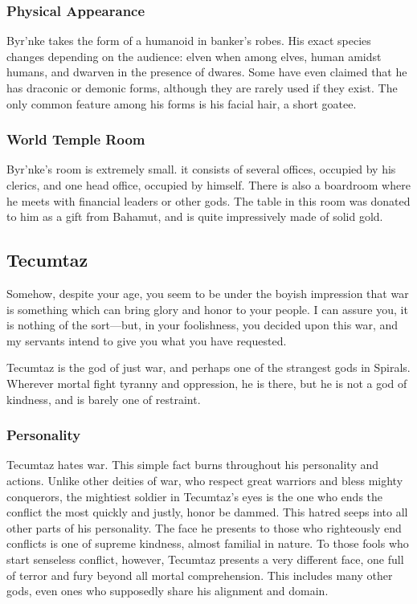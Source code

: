 \subsubsection*{Physical Appearance}
Byr'nke takes the form of a humanoid in banker's robes.
His exact species changes depending on the audience: elven when among elves, human amidst humans, and dwarven in the presence of dwares.
Some have even claimed that he has draconic or demonic forms, although they are rarely used if they exist.
The only common feature among his forms is his facial hair, a short goatee.

\subsubsection*{World Temple Room}
Byr'nke's room is extremely small.
it consists of several offices, occupied by his clerics, and one head office, occupied by himself.
There is also a boardroom where he meets with financial leaders or other gods.
The table in this room was donated to him as a gift from Bahamut, and is quite impressively made of solid gold.

\subsection*{Tecumtaz}
\begin{goddesc}
\end{goddesc}
\begin{itquote}
Somehow, despite your age, you seem to be under the boyish impression that war is something which can bring glory and honor to your people.
I can assure you, it is nothing of the sort---but, in your foolishness, you decided upon this war, and my servants intend to give you what you have requested.
\end{itquote}
Tecumtaz is the god of just war, and perhaps one of the strangest gods in Spirals.
Wherever mortal fight tyranny and oppression, he is there, but he is not a god of kindness, and is barely one of restraint.

\subsubsection*{Personality}
Tecumtaz hates war.
This simple fact burns throughout his personality and actions.
Unlike other deities of war, who respect great warriors and bless mighty conquerors, the mightiest soldier in Tecumtaz's eyes is the one who ends the conflict the most quickly and justly, honor be dammed.
This hatred seeps into all other parts of his personality.
The face he presents to those who righteously end conflicts is one of supreme kindness, almost familial in nature.
To those fools who start senseless conflict, however, Tecumtaz presents a very different face, one full of terror and fury beyond all mortal comprehension.
This includes many other gods, even ones who supposedly share his alignment and domain.


